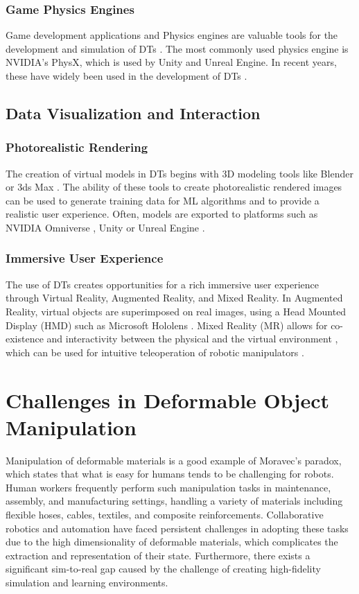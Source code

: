 \subsubsection{Game Physics Engines}
Game development applications and Physics engines are valuable tools for the development and simulation of DTs \cite{Clausen2022}. The most commonly used physics engine is NVIDIA's PhysX, which is used by Unity and Unreal Engine. In recent years, these have widely been used in the development of DTs \cite{BioMech-Eval, Mania2020, Yun2022, Mourtzis2022-MR}.

\subsection{Data Visualization and Interaction}
\subsubsection{Photorealistic Rendering}
The creation of virtual models in DTs begins with 3D modeling tools like Blender \cite{Alexopoulos2020} or 3ds Max \cite{Wu2019}. The ability of these tools to create photorealistic rendered images can be used to generate training data for ML algorithms and to provide a realistic user experience. Often, models are exported to platforms such as NVIDIA Omniverse \cite{Akar2022}, Unity \cite{Dianatfar2021} or Unreal Engine \cite{Mania2020}.

\subsubsection{Immersive User Experience}
The use of DTs creates opportunities for a rich immersive user experience through Virtual Reality, Augmented Reality, and Mixed Reality. In Augmented Reality, virtual objects are superimposed on real images, using a Head Mounted Display (HMD) such as Microsoft Hololens \cite{Kunz2022, Li2022}. Mixed Reality (MR) allows for co-existence and interactivity between the physical and the virtual environment \cite{Ke2019}, which can be used for intuitive teleoperation of robotic manipulators \cite{Su2022}.

\section{Challenges in Deformable Object Manipulation}
Manipulation of deformable materials is a good example of Moravec’s paradox, which states that what is easy for humans tends to be challenging for robots. Human workers frequently perform such manipulation tasks in maintenance, assembly, and manufacturing settings, handling a variety of materials including flexible hoses, cables, textiles, and composite reinforcements. Collaborative robotics and automation have faced persistent challenges in adopting these tasks due to the high dimensionality of deformable materials, which complicates the extraction and representation of their state. Furthermore, there exists a significant sim-to-real gap caused by the challenge of creating high-fidelity simulation and learning environments.

